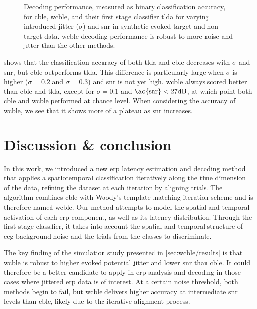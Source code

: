 \begin{figure}
  \sffamily\sansmath
  
  \caption[Synthetic decoding results]{Decoding performance, measured as binary
  classification accuracy, for \ac{cble}, \ac{wcble}, and their first stage
  classifier \ac{tlda} for varying introduced jitter ($\sigma$) and \ac{snr} in
  synthetic evoked target and non-target data.
  \Ac{wcble} decoding performance is robust to more noise and jitter than the other methods.}
  \label{fig:wcble/results/accuracy}
\end{figure}

 shows that the classification accuracy of both \ac{tlda} and \ac{cble}
decreases with
$\sigma$ and \ac{snr}, but \ac{cble} outperforms \ac{tlda}.
This difference is particularly large when $\sigma$ is higher ($\sigma=0.2$
and $\sigma=0.3$) and \ac{snr} is not yet high.
\Ac{wcble} always scored better than \ac{cble} and \ac{tlda}, except for
$\sigma=0.1$ and $\text{\ac{snr}} < 27 \text{dB}$, at which point both \ac{cble}
and \ac{wcble} performed at chance level.
When considering the accuracy of \ac{wcble}, we see that it shows more of a
plateau as \ac{snr} increases.

\section{Discussion \& conclusion}

In this work, we introduced a new \ac{erp} latency estimation and decoding
method that applies a spatiotemporal classification iteratively along the time
dimension of the data, refining the dataset at each iteration by aligning
trials.
The algorithm combines \acf{cble} with Woody's template matching iteration
scheme and is therefore named \acf{wcble}.
Our method attempts to model the spatial and temporal activation of
each \ac{erp} component, as well as its latency distribution.
Through the first-stage classifier, it takes into account the
spatial and temporal structure of \ac{eeg} background noise and the trials from the
classes to discriminate.

The key finding of the simulation study presented
in \cref{sec:wcble/results} is that \ac{wcble} is robust to higher evoked
potential jitter and lower \ac{snr} than \ac{cble}.
It could therefore be a better candidate to apply in \ac{erp} analysis and
decoding in those cases where jittered \ac{erp} data is of interest.
At a certain noise threshold, both methods begin to fail, but \ac{wcble}
delivers higher accuracy at intermediate \ac{snr} levels than \ac{cble}, likely due to the iterative alignment process.

